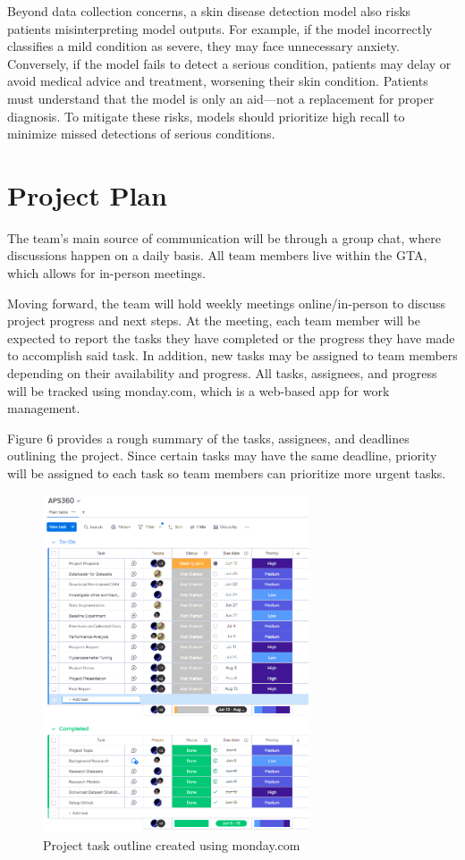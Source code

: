 \documentclass{article} %
\begin{document}
Beyond data collection concerns, a skin disease detection model also risks patients misinterpreting model outputs. For example, if the model incorrectly classifies a mild condition as severe, they may face unnecessary anxiety. Conversely, if the model fails to detect a serious condition, patients may delay or avoid medical advice and treatment, worsening their skin condition. Patients must understand that the model is only an aid—not a replacement for proper diagnosis. To mitigate these risks, models should prioritize high recall to minimize missed detections of serious conditions.

\section{Project Plan}

The team's main source of communication will be through a group chat, where discussions happen on a daily basis. All team members live within the GTA, which allows for in-person meetings.

Moving forward, the team will hold weekly meetings online/in-person to discuss project progress and next steps. At the meeting, each team member will be expected to report the tasks they have completed or the progress they have made to accomplish said task. In addition, new tasks may be assigned to team members depending on their availability and progress. All tasks, assignees, and progress will be tracked using monday.com, which is a web-based app for work management.

Figure 6 provides a rough summary of the tasks, assignees, and deadlines outlining the project. Since certain tasks may have the same deadline, priority will be assigned to each task so team members can prioritize more urgent tasks.

\begin{figure}[h]
\begin{center}
\includegraphics[width=0.7\textwidth]{Figs/project_task_outline.png}
\end{center}
\caption{Project task outline created using monday.com}
\end{figure}
\end{document}
